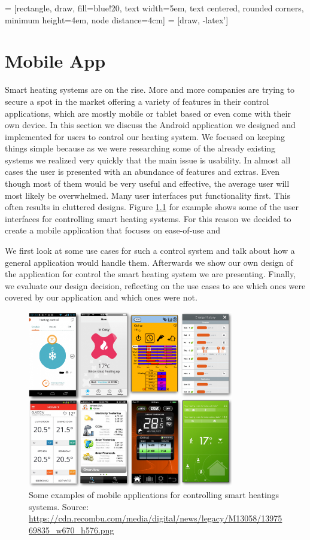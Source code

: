  = [rectangle, draw, fill=blue!20, 
    text width=5em, text centered, rounded corners, minimum height=4em, node distance=4cm]
 = [draw, -latex']

\chapter{Mobile App}
\label{sec:mobile_app}

Smart heating systems are on the rise. More and more companies are trying to secure a spot in the market offering a variety of features in their control applications, which are mostly mobile or tablet based or even come with their own device. In this section we discuss the Android application we designed and implemented for users to control our heating system. We focused on keeping things simple because as we were researching some of the already existing systems we realized very quickly that the main issue is usability. In almost all cases the user is presented with an abundance of features and extras. Even though most of them would be very useful and effective, the average user will most likely be overwhelmed. Many user interfaces put functionality first. This often results in cluttered designs. Figure \ref{fig:smart_heating_apps} for example shows some of the user interfaces for controlling smart heating systems. For this reason we decided to create a mobile application that focuses on ease-of-use and 

We first look at some use cases for such a control system and talk about how a general application would handle them. Afterwards we show our own design of the application for control the smart heating system we are presenting. Finally, we evaluate our design decision, reflecting on the use cases to see which ones were covered by our application and which ones were not.

\begin{figure}[h]
	\begin{center}
		\includegraphics[width=0.8\textwidth]{images/smart_heating_apps.png}
	\end{center}
	\caption{Some examples of mobile applications for controlling smart heatings systems. Source: \url{https://cdn.recombu.com/media/digital/news/legacy/M13058/1397569835_w670_h576.png}}
	\label{fig:smart_heating_apps}
\end{figure}


